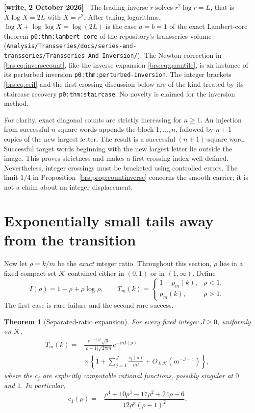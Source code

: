 \documentclass[11pt]{article}
\numberwithin{equation}{section}
\newtheorem{theorem}{Theorem}[section]
\theoremstyle{remark}\newtheorem{remark}[theorem]{Remark}
\newcommand{\file}[1]{\nolinkurl{#1}}
\newenvironment{writenote}{\par\smallskip\begingroup\small\noindent\textbf{[write, 2 October 2026]}\ }{\par\endgroup\smallskip}
\begin{document}
\begin{writenote}
The leading inverse $r$ solves $r^2\log r=L$, that is $X\log X=2L$ with $X=r^2$. After taking logarithms, $\log X+\log\log X=\log(2L)$ is the case $a=b=1$ of the exact Lambert-core theorem \texttt{p0:thm:lambert-core} of the repository's transseries volume (\file{Analysis/Transseries/docs/series-and-transseries/}\allowbreak\file{Transseries_And_Inversion/}). The Newton correction in \eqref{brs:eq:inversecount}, like the inverse expansion \eqref{brs:eq:quantile}, is an instance of its perturbed inversion \texttt{p0:thm:perturbed-inversion}. The integer brackets \eqref{brs:eq:ceil} and the first-crossing discussion below are of the kind treated by its staircase recovery \texttt{p0:thm:staircase}. No novelty is claimed for the inversion method.
\end{writenote}

For clarity, exact diagonal counts are strictly increasing for $n\geq1$.
An injection from successful $n$-square words appends the block
$1,\ldots,n$, followed by $n+1$ copies of the new largest letter.  The
result is a successful $(n+1)$-square word.  Successful target words
beginning with the new largest letter lie outside the image.  This proves
strictness and makes a first-crossing index well-defined.  Nevertheless,
integer crossings must be bracketed using controlled errors.  The limit
$1/4$ in Proposition~\ref{brs:prop:countinverse} concerns the smooth carrier;
it is not a claim about an integer displacement.

\section{Exponentially small tails away from the transition}\label{brs:sec:rare}

Now let $\rho=k/m$ be the \emph{exact} integer ratio.  Throughout this
section, $\rho$ lies in a fixed compact set $\mathcal K$ contained either
in $(0,1)$ or in $(1,\infty)$.  Define
\[
 I(\rho)=1-\rho+\rho\log\rho,\qquad
 T_m(k)=\begin{cases}1-p_m(k),&\rho<1,\\p_m(k),&\rho>1.\end{cases}
\]
The first case is rare failure and the second rare success.

\begin{theorem}[Separated-ratio expansion]\label{brs:thm:rare}
For every fixed integer $J\geq0$, uniformly on $\mathcal K$,
\begin{align}\label{brs:eq:rare}
 T_m(k)={}&\frac{e^{1-1/\rho}\sqrt\rho}
 {|\rho-1|\sqrt{2\pi m}}e^{-mI(\rho)}\\
 &\times\left\{1+\sum_{j=1}^J\frac{c_j(\rho)}{m^j}
 +O_{J,\mathcal K}(m^{-J-1})\right\},\nonumber
\end{align}
where the $c_j$ are explicitly computable rational functions, possibly
singular at $0$ and $1$.  In particular,
\begin{equation}\label{brs:eq:c1}
 c_1(\rho)=-\frac{\rho^4+10\rho^3-17\rho^2+24\rho-6}
 {12\rho^3(\rho-1)^2}.
\end{equation}
\end{theorem}
\end{document}
